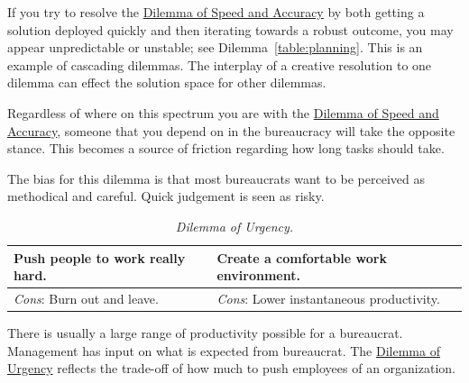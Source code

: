 If you try to resolve the \hyperref[table:quick-methodical]{Dilemma of Speed and Accuracy} by both getting a solution deployed quickly and then iterating towards a robust outcome, you may appear unpredictable or unstable; see Dilemma~\ref{table:planning}. This is an example of cascading dilemmas. The interplay of a creative resolution to one dilemma can effect the solution space for other dilemmas. 

Regardless of where on this spectrum you are with the \hyperref[table:quick-methodical]{Dilemma of Speed and Accuracy}, someone that you depend on in the bureaucracy will take the opposite stance. This becomes a source of friction regarding how long tasks should take. 

The bias for this dilemma is that most bureaucrats want to be perceived as methodical and careful. Quick judgement is seen as risky. 


\begin{center}
\begin{table}[H] %
\begin{tabular}{ | m{\dilemmatablewidth}| m{\dilemmatablewidth} | } 
  \hline
  \textbf{Push people to work really hard.} & 
  \textbf{Create a comfortable work environment.} \\ 
  \hline
  \textit{Cons}: Burn out and leave. & 
  \textit{Cons}: Lower instantaneous productivity. \\  
  \hline
\end{tabular}
\caption{
\textit{Dilemma of Urgency.}
}
\label{table:rate-of-work}
\end{table}
\end{center}

There is usually a large range of productivity possible for a bureaucrat. Management has input on what is expected from bureaucrat. The 
\hyperref[table:rate-of-work]{Dilemma of Urgency} reflects the trade-off of how much to push employees of an organization. 



